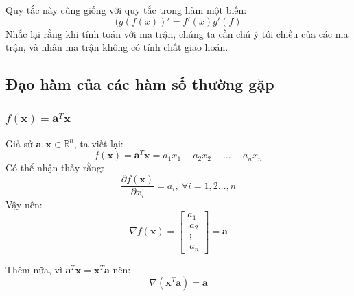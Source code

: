 \documentclass[12pt]{article}
\begin{document}
Quy tắc này cũng giống với quy tắc trong hàm một biến:  
\begin{equation*} 
(g(f(x))' = f'(x)g'(f) 
\end{equation*} 
Nhắc lại rằng khi tính toán với ma trận, chúng ta cần chú ý tới chiều của các ma trận, và nhân ma trận không có tính chất giao hoán.  
 
\subsection{Đạo hàm của các hàm số thường gặp }
 
\subsubsection{$f(\mathbf{x}) = \mathbf{a}^T\mathbf{x}$}
 
Giả sử $\mathbf{a}, \mathbf{x} \in \mathbb{R}^n$, ta viết lại: 
\begin{equation*} 
f(\mathbf{x}) = \mathbf{a}^T\mathbf{x} = a_1 x_1 + a_2 x_2 + \dots + a_nx_n 
\end{equation*} 
Có thể nhận thấy rằng: 
\begin{equation*} 
\frac{\partial f(\mathbf{x})}{\partial x_i} = a_i, ~ \forall i = 1, 2\dots, n 
\end{equation*} 
Vậy nên: 
\begin{equation*} 
\nabla f(\mathbf{x}) =  
\left[ 
\begin{matrix} 
    a_1 \\\ 
    a_2 \\\ 
    \vdots \\\ 
    a_n 
\end{matrix} 
\right] = \mathbf{a}
\end{equation*} 
 
Thêm nữa, vì $\mathbf{a}^T\mathbf{x} = \mathbf{x}^T\mathbf{a}$ nên: 
\begin{equation*} 
\nabla (\mathbf{x}^T\mathbf{a}) = \mathbf{a} 
\end{equation*} 
 
 
\end{document}
